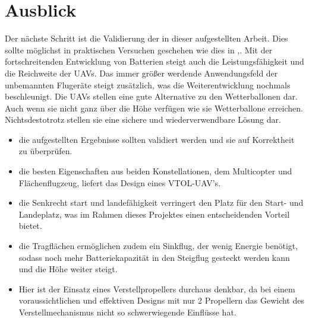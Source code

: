 \section{Ausblick}
Der nächste Schritt ist die Validierung der in dieser aufgestellten Arbeit. Dies sollte möglichst in praktischen Versuchen geschehen wie dies in \cite{Ostler.2007},\cite{PCUP}. Mit der fortschreitenden Entwicklung von Batterien steigt auch die Leistungsfähigkeit und die Reichweite der UAVs. Das immer größer werdende Anwendungsfeld der unbemannten Flugeräte steigt zusätzlich, was die Weiterentwicklung nochmals beschleunigt.
Die UAVs stellen eine gute Alternative zu den Wetterballonen dar. Auch wenn sie nicht ganz über die Höhe verfügen wie sie Wetterballone erreichen. Nichtsdestotrotz stellen sie eine sichere und wiederverwendbare Lösung dar.

\begin{itemize}
	\item die aufgestellten Ergebnisse sollten validiert werden und sie auf Korrektheit zu überprüfen. 
	\item die besten Eigenschaften aus beiden Konstellationen, dem Multicopter und Flächenflugzeug, liefert das Design eines VTOL-UAV's.
	\item die Senkrecht start und landefähigkeit verringert den Platz für den Start- und Landeplatz, was im Rahmen dieses Projektes einen entscheidenden Vorteil bietet. 
	\item die Tragflächen ermöglichen zudem ein Sinkflug, der wenig Energie benötigt, sodass noch mehr Batteriekapazität in den Steigflug gesteckt werden kann und die Höhe weiter steigt. 
	\item Hier ist der Einsatz eines Verstellpropellers durchaus denkbar, da bei einem voraussichtlichen und effektiven Designs mit nur 2 Propellern das Gewicht des Verstellmechanismus nicht so schwerwiegende Einflüsse hat.
\end{itemize}